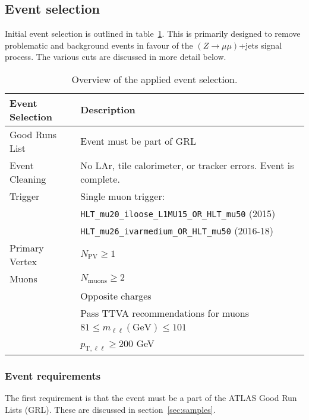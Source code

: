 \subsection{Event selection}
\label{sec:selection}

Initial event selection is outlined in table~\ref{lab:eventsel}. This is primarily designed to remove problematic and background events in favour of the $(Z\to\mu\mu)$+jets signal process. The various cuts are discussed in more detail below.

\begin{table}[h!]
    \centering
    \begin{tabular}{l|l}
         \hline
    \textbf{Event Selection} & \textbf{Description} \\ \hline
    Good Runs List & Event must be part of GRL \\ \hline
    Event Cleaning & No LAr, tile calorimeter, or tracker errors. Event is complete. \\ \hline
    Trigger & Single muon trigger: \\
    & \texttt{HLT\_mu20\_iloose\_L1MU15\_OR\_HLT\_mu50} (2015) \\
    & \texttt{HLT\_mu26\_ivarmedium\_OR\_HLT\_mu50} (2016-18) \\ \hline
    Primary Vertex & $N_{\text{PV}}\geq1$ \\ \hline
    Muons & $N_{\text{muons}}\geq2$ \\
          & Opposite charges \\
          & Pass TTVA recommendations for muons \\
          & $81\leq m_{\ell\ell} (\text{GeV})\leq 101$ \\
          & $p_{\text{T},\ell\ell}\geq200$ GeV \\ \hline
    \end{tabular}
    \caption{Overview of the applied event selection.}
    \label{lab:eventsel}
\end{table}

\subsubsection{Event requirements}
The first requirement is that the event must be a part of the ATLAS Good Run Lists (GRL). These are discussed in section~\ref{sec:samples}.

